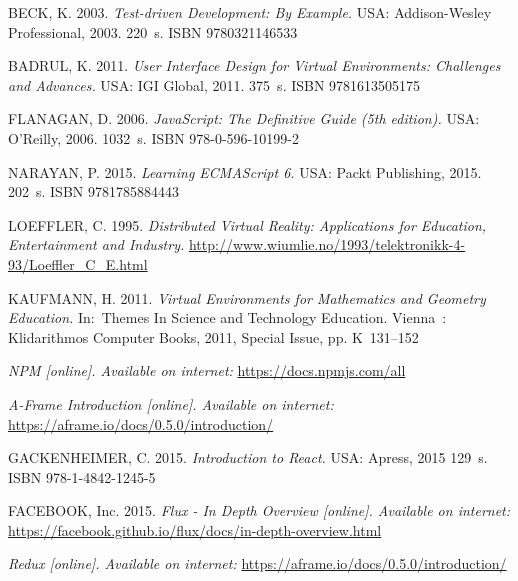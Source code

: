 \begin{thebibliography}{1}

BECK, K. 2003. \emph{Test-driven Development: By Example.} USA: Addison-Wesley Professional, 2003. 220~s. ISBN 9780321146533

BADRUL, K. 2011. \emph{User Interface Design for Virtual Environments: Challenges and Advances.} USA: IGI Global, 2011. 375~s. ISBN 9781613505175

FLANAGAN, D. 2006. \emph{JavaScript: The Definitive Guide (5th edition).} USA: O'Reilly, 2006. 1032~s. ISBN 978-0-596-10199-2

NARAYAN, P. 2015. \emph{Learning ECMAScript 6.} USA: Packt Publishing, 2015. 202~s. ISBN 9781785884443

LOEFFLER, C. 1995. \emph{Distributed Virtual Reality: Applications for Education, Entertainment and Industry.} \url{http://www.wiumlie.no/1993/telektronikk-4-93/Loeffler_C_E.html}

KAUFMANN, H. 2011. \emph{Virtual Environments for Mathematics and Geometry Education.} In:~Themes In Science and Technology Education. Vienna~: Klidarithmos Computer Books, 2011, Special Issue, pp. K~131--152

\emph{NPM [online]. Available on internet:} \url{https://docs.npmjs.com/all}

\emph{A-Frame Introduction [online]. Available on internet:} \url{https://aframe.io/docs/0.5.0/introduction/}

GACKENHEIMER, C. 2015. \emph{Introduction to React.} USA: Apress, 2015 129~s. ISBN 978-1-4842-1245-5

FACEBOOK, Inc. 2015. \emph{Flux - In Depth Overview [online]. Available on internet:} \url{https://facebook.github.io/flux/docs/in-depth-overview.html}

\emph{Redux [online]. Available on internet:} \url{https://aframe.io/docs/0.5.0/introduction/}





\end{thebibliography}

